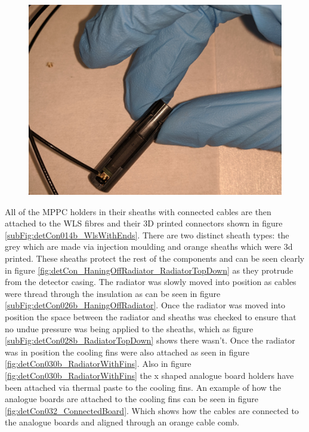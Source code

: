 \begin{figure}[htbp]
\centering
\includegraphics[width=0.8\linewidth]{Chapter3/Figs/Raster/detCon023b_HoldersConnectedZoom.png}
\label{fig:detCon023b_HoldersConnectedZoom}
\end{figure}

All of the MPPC holders in their sheaths with connected cables are then attached to the WLS fibres and their 3D printed connectors shown in figure \ref{subFig:detCon014b_WlsWithEnds}. There are two distinct sheath types: the grey which are made via injection moulding and orange sheaths which were 3d printed. These sheaths protect the rest of the components and can be seen clearly in figure \ref{fig:detCon_HaningOffRadiator_RadiatorTopDown} as they protrude from the detector casing. The radiator was slowly moved into position as cables were thread through the insulation as can be seen in figure \ref{subFig:detCon026b_HaningOffRadiator}. Once the radiator was moved into position the space between the radiator and sheaths was checked to ensure that no undue pressure was being applied to the sheaths, which as figure \ref{subFig:detCon028b_RadiatorTopDown} shows there wasn't. Once the radiator was in position the cooling fins were also attached as seen in figure \ref{fig:detCon030b_RadiatorWithFins}. Also in figure \ref{fig:detCon030b_RadiatorWithFins} the x shaped analogue board holders have been attached via thermal paste to the cooling fins. An example of how the analogue boards are attached to the cooling fins can be seen in figure \ref{fig:detCon032_ConnectedBoard}. Which shows how the cables are connected to the analogue boards and aligned through an orange cable comb. 

